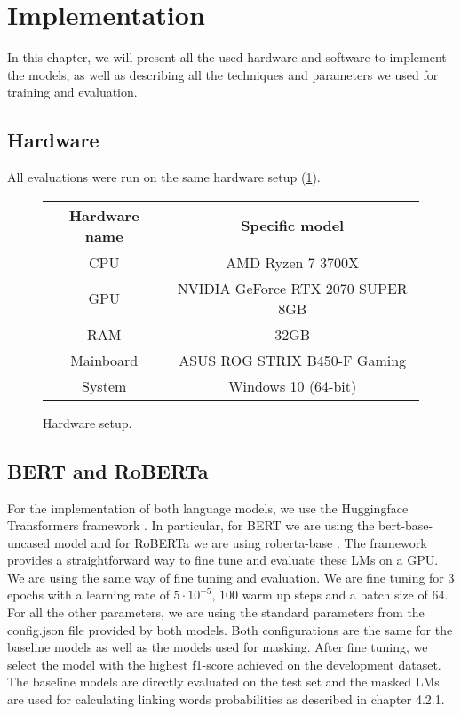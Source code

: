 \section{Implementation}
In this chapter, we will present all the used hardware and software to implement the models, as well as describing all the techniques and parameters we used for training and evaluation.

\subsection{Hardware}
All evaluations were run on the same hardware setup (\ref{fig:hardware1}).

\begin{figure}[H]
  \begin{center}
   	\begin{tabular}{|| c | c ||}
   	\hline
   	Hardware name & Specific model \\
   	\hline\hline
   	CPU & AMD Ryzen 7 3700X \\
 	\hline
 	GPU & NVIDIA GeForce RTX 2070 SUPER 8GB \\
 	\hline
 	RAM & 32GB \\
 	\hline
 	Mainboard & ASUS ROG STRIX B450-F Gaming \\
 	\hline
 	System & Windows 10 (64-bit) \\
 	\hline
	\end{tabular}
  \end{center}
  \caption{Hardware setup.}%
  \label{fig:hardware1}
\end{figure}

\subsection{BERT and RoBERTa}
For the implementation of both language models, we use the Huggingface Transformers framework \cite{transformers}. In particular, for BERT we are using the bert-base-uncased model \cite{bertbaseuncased} and for RoBERTa we are using roberta-base \cite{robertabase}. The framework provides a straightforward way to fine tune and evaluate these LMs on a GPU\cite{berttraining}. We are using the same way of fine tuning and evaluation. We are fine tuning for $3$ epochs with a learning rate of $5 \cdot 10^{-5}$, $100$ warm up steps and a batch size of $64$. For all the other parameters, we are using the standard parameters from the config.json file provided by both models. Both configurations are the same for the baseline models as well as the models used for masking. After fine tuning, we select the model with the highest f1-score achieved on the development dataset. \\
The baseline models are directly evaluated on the test set and the masked LMs are used for calculating linking words probabilities as described in chapter 4.2.1.

